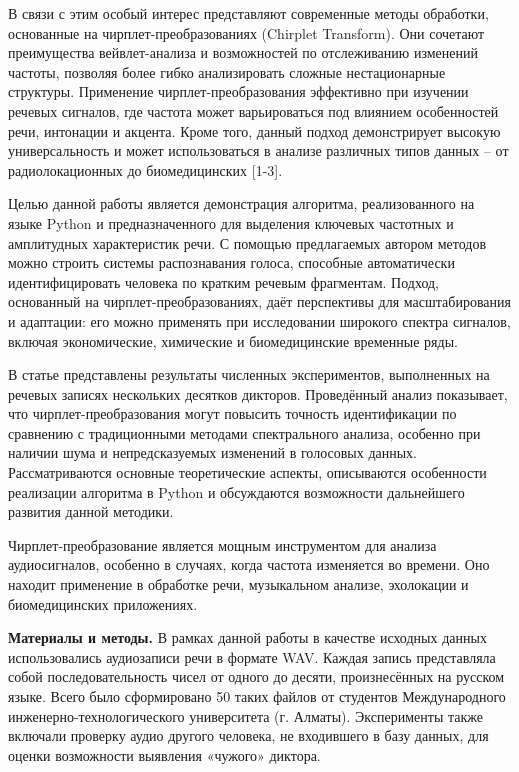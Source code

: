 В связи с этим особый интерес представляют современные методы обработки,
основанные на чирплет-преобразованиях (Chirplet Transform). Они сочетают
преимущества вейвлет-анализа и возможностей по отслеживанию изменений
частоты, позволяя более гибко анализировать сложные нестационарные
структуры. Применение чирплет-преобразования эффективно при изучении
речевых сигналов, где частота может варьироваться под влиянием
особенностей речи, интонации и акцента. Кроме того, данный подход
демонстрирует высокую универсальность и может использоваться в анализе
различных типов данных -- от радиолокационных до биомедицинских
{[}1-3{]}.

Целью данной работы является демонстрация алгоритма, реализованного на
языке Python и предназначенного для выделения ключевых частотных и
амплитудных характеристик речи. С помощью предлагаемых автором методов
можно строить системы распознавания голоса, способные автоматически
идентифицировать человека по кратким речевым фрагментам. Подход,
основанный на чирплет-преобразованиях, даёт перспективы для
масштабирования и адаптации: его можно применять при исследовании
широкого спектра сигналов, включая экономические, химические и
биомедицинские временные ряды.

В статье представлены результаты численных экспериментов, выполненных на
речевых записях нескольких десятков дикторов. Проведённый анализ
показывает, что чирплет-преобразования могут повысить точность
идентификации по сравнению с традиционными методами спектрального
анализа, особенно при наличии шума и непредсказуемых изменений в
голосовых данных. Рассматриваются основные теоретические аспекты,
описываются особенности реализации алгоритма в Python и обсуждаются
возможности дальнейшего развития данной методики.

Чирплет-преобразование является мощным инструментом для анализа
аудиосигналов, особенно в случаях, когда частота изменяется во времени.
Оно находит применение в обработке речи, музыкальном анализе, эхолокации
и биомедицинских приложениях.

{\bfseries Материалы и методы.} В рамках данной работы в качестве исходных
данных использовались аудиозаписи речи в формате WAV. Каждая запись
представляла собой последовательность чисел от одного до десяти,
произнесённых на русском языке. Всего было сформировано 50 таких файлов
от студентов Международного инженерно-технологического университета (г.
Алматы). Эксперименты также включали проверку аудио другого человека, не
входившего в базу данных, для оценки возможности выявления «чужого»
диктора.

